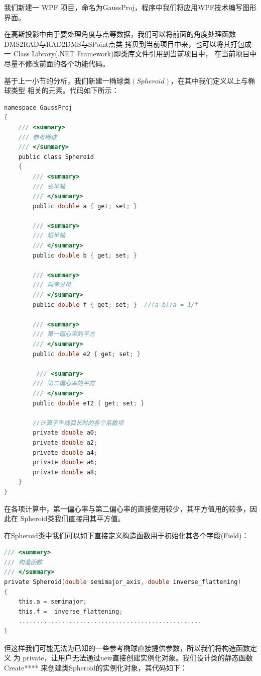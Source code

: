 我们新建一 WPF 项目，命名为GaussProj，程序中我们将应用WPF技术编写图形界面。

在高斯投影中由于要处理角度与点等数据，我们可以将前面的角度处理函数DMS2RAD与RAD2DMS与SPoint点类
拷贝到当前项目中来，也可以将其打包成一 Class Library(.NET Framework)即类库文件引用到当前项目中，
在当前项目中尽量不修改前面的各个功能代码。

基于上一小节的分析，我们新建一椭球类$(Spheroid)$，在其中我们定义以上与椭球类型
相关的元素。代码如下所示：

\begin{lstlisting}[language=C]
namespace GaussProj
{
    /// <summary>
    /// 参考椭球
    /// </summary>
    public class Spheroid
    {
        /// <summary>
        /// 长半轴
        /// </summary>
        public double a { get; set; }

        /// <summary>
        /// 短半轴
        /// </summary>
        public double b { get; set; }

        /// <summary>
        /// 扁率分母
        /// </summary>
        public double f { get; set; }  //(a-b)/a = 1/f

        /// <summary>
        /// 第一偏心率的平方
        /// </summary>
        public double e2 { get; set; }

         /// <summary>
        /// 第二偏心率的平方
        /// </summary>
        public double eT2 { get; set; }

        //计算子午线弧长时的各个系数项
        private double a0;
        private double a2;
        private double a4;
        private double a6;
        private double a8;
    }
}
\end{lstlisting}

在各项计算中，第一偏心率与第二偏心率的直接使用较少，其平方值用的较多，因此在
Spheroid类我们直接用其平方值。

 在Spheroid类中我们可以如下直接定义构造函数用于初始化其各个字段(Field)：
  \begin{lstlisting}[language=C]
/// <summary>
/// 构造函数
/// </summary>
private Spheroid(double semimajor_axis, double inverse_flattening)
{
    this.a = semimajor;
    this.f =  inverse_flattening;
    ...................................................
}
\end{lstlisting}

但这样我们可能无法为已知的一些参考椭球直接提供参数，所以我们将构造函数定义
为 private，让用户无法通过new直接创建实例化对象。我们设计类的静态函数
Create**** 来创建类Spheroid的实例化对象，其代码如下：

